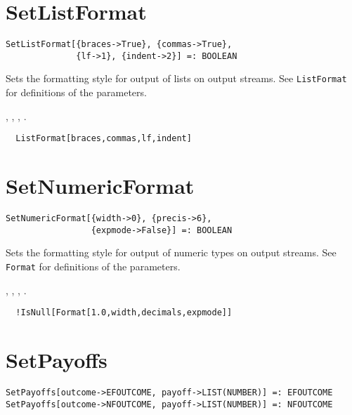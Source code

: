 \section*{SetListFormat}\label{ExtSetListFormat}
\begin{verbatim}
SetListFormat[{braces->True}, {commas->True}, 
              {lf->1}, {indent->2}] =: BOOLEAN 
\end{verbatim}

\noindent
Sets the formatting style for output of lists on output streams. See
\verb+ListFormat+ for definitions of the parameters. 

\seealso
{},
,
,
.

\udfbody
\begin{verbatim}
  ListFormat[braces,commas,lf,indent]
\end{verbatim} 


\section*{SetNumericFormat}\label{ExtSetNumericFormat}
\begin{verbatim}
SetNumericFormat[{width->0}, {precis->6}, 
                 {expmode->False}] =: BOOLEAN 
\end{verbatim}

\noindent
Sets the formatting style for output of numeric types on output
streams.  See \verb+Format+ for definitions of the parameters.

\seealso
{},
,
,
.

\udfbody
\begin{verbatim}
  !IsNull[Format[1.0,width,decimals,expmode]]
\end{verbatim} 


\section*{SetPayoffs}\label{ExtSetPayoffs}
\begin{verbatim}
SetPayoffs[outcome->EFOUTCOME, payoff->LIST(NUMBER)] =: EFOUTCOME 
SetPayoffs[outcome->NFOUTCOME, payoff->LIST(NUMBER)] =: NFOUTCOME 
\end{verbatim}
 
